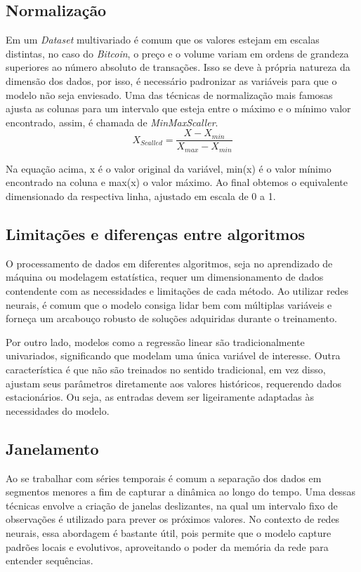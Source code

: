 \subsection{Normalização} \label{sec:normalizar}
Em um \textit{Dataset} multivariado é comum que os valores estejam em escalas distintas, no caso do \textit{Bitcoin}, o preço e o volume variam em ordens de grandeza superiores ao número absoluto de transações.
Isso se deve à própria natureza da dimensão dos dados, por isso, é necessário padronizar as variáveis para que o modelo não seja enviesado.
Uma das técnicas de normalização mais famosas ajusta as colunas para um intervalo que esteja entre o máximo e o mínimo valor encontrado, assim,  é chamada de \textit{MinMaxScaller}.
\begin{equation}
    {X_{Scalled} = \frac{X-X_{min}}{X_{max}-X_{min}}}
    \label{eq:scalled}
\end{equation}

Na equação acima, x é o valor original da variável, min(x) é o valor mínimo encontrado na coluna e max(x) o valor máximo.
Ao final obtemos o equivalente dimensionado da respectiva linha, ajustado em escala de 0 a 1.

\subsection{Limitações e diferenças entre algoritmos} \label{sec:limitacao}
O processamento de dados em diferentes algoritmos, seja no aprendizado de máquina ou modelagem estatística, requer um dimensionamento de dados contendente com as necessidades e limitações de cada método.
Ao utilizar redes neurais, é comum que o modelo consiga lidar bem com múltiplas variáveis e forneça um arcabouço robusto de soluções adquiridas durante o treinamento.

Por outro lado, modelos como a regressão linear são tradicionalmente univariados, significando que modelam uma única variável de interesse.
Outra característica é que não são treinados no sentido tradicional, em vez disso, ajustam seus parâmetros diretamente aos valores históricos, requerendo dados estacionários.
Ou seja, as entradas devem ser ligeiramente adaptadas às necessidades do modelo.

\subsection{Janelamento} \label{sec:janelamento}

Ao se trabalhar com séries temporais é comum a separação dos dados em segmentos menores
 a fim de capturar a dinâmica ao longo do tempo.
Uma dessas técnicas envolve a criação de janelas deslizantes, na qual um intervalo fixo de observações é utilizado para prever os próximos valores.
No contexto de redes neurais, essa abordagem é bastante útil, pois permite que o modelo capture padrões locais e evolutivos, aproveitando o poder da memória da rede para entender sequências.

